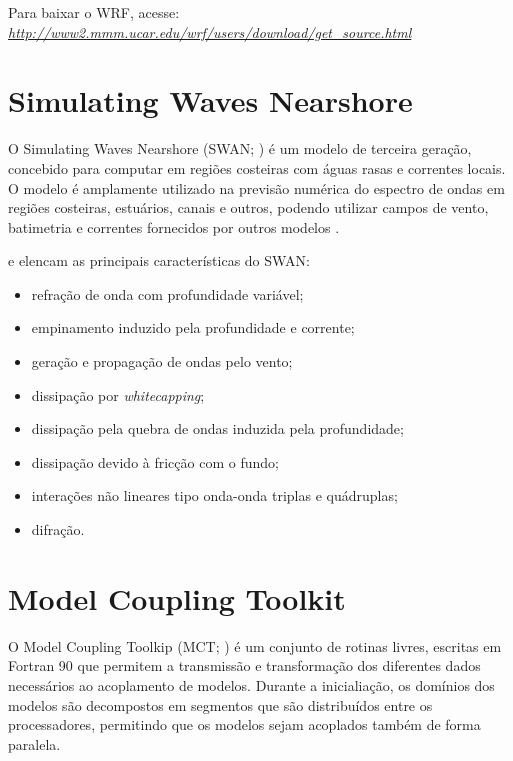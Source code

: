 \noindent Para baixar o WRF, acesse: \textcolor{bleu_cite}{\href{http://www2.mmm.ucar.edu/wrf/users/download/get\_source.html}{\textit{http://www2.mmm.ucar.edu/wrf/users/download/get\_source.html}}}
\bigskip


\section{Simulating Waves Nearshore}
\bigskip

\noindent O Simulating Waves Nearshore (SWAN; \cite{Booij1999,Booij1996}) é um modelo de terceira geração, 
          concebido para computar em regiões costeiras com águas rasas e correntes locais. O modelo é amplamente utilizado na previsão numérica do 
          espectro de ondas em regiões costeiras, estuários, canais e outros, podendo utilizar campos de vento, batimetria e 
          correntes fornecidos por outros modelos \parencite{Booij1999,Booij1996}.
\bigskip

\noindent \textcite{Dasilva2013} e \textcite{Booij1999,Booij1996} elencam as principais características do SWAN:
\bigskip

\begin{itemize}
\item refração de onda com profundidade variável;
\item empinamento induzido pela profundidade e corrente;
\item geração e propagação de ondas pelo vento;
\item dissipação por \textit{whitecapping};
\item dissipação pela quebra de ondas induzida pela profundidade;
\item dissipação devido à fricção com o fundo;
\item interações não lineares tipo onda-onda triplas e quádruplas;
\item difração.
\end{itemize}
\bigskip

\section{Model Coupling Toolkit}
\bigskip

\noindent O Model Coupling Toolkip (MCT; \cite{Larson2005,Jacob2005,Warner2008}) é um conjunto de rotinas livres, 
          escritas em Fortran 90 que permitem a transmissão e transformação dos diferentes dados necessários ao acoplamento
          de modelos. Durante a inicialiação, os domínios dos modelos são decompostos em segmentos que são distribuídos
          entre os processadores, permitindo que os modelos sejam acoplados também de forma paralela.
\bigskip

